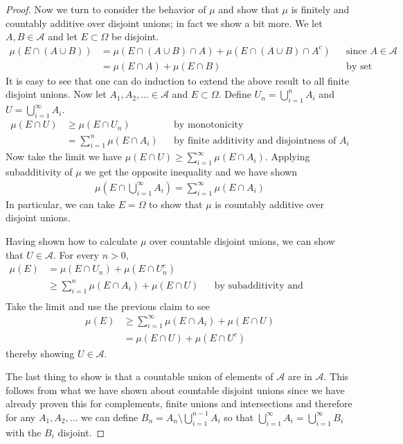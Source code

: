 \begin{proof}
Now we turn to consider the behavior of $\mu$ and show that $\mu$ is
finitely and countably additive over disjoint unions; in fact we show
a bit more.
We let $A,B \in \mathcal{A}$ and let $E \subset \Omega$
be disjoint.
\begin{align*}
\mu(E \cap (A \cup B)) &= \mu(E \cap (A \cup B) \cap A) + \mu(E \cap
(A \cup B) \cap A^c) & & \text{since $A \in \mathcal{A}$} \\
&= \mu(E \cap A) + \mu(E \cap B) & &\text{by set algebra}
\end{align*}
It is easy to see that one can do induction to extend the above result
to all finite disjoint unions.
Now let $A_1, A_2, \dots \in \mathcal{A}$ and $E \subset \Omega$.
Define $U_n = \bigcup_{i=1}^n A_i$ and $U = \bigcup_{i=1}^\infty A_i$.
\begin{align*}
\mu(E \cap U) &\geq \mu(E \cap U_n) & & \text{by monotonicity} \\
&= \sum_{i=1}^n \mu(E \cap A_i) & &\text{by finite additivity and
  disjointness of $A_i$}
\end{align*}
Now take the limit we have $\mu(E \cap U) \geq \sum_{i=1}^\infty \mu(E
\cap A_i)$.  Applying subadditivity of $\mu$ we get the opposite
inequality and we have shown 
\begin{align*}
\mu(E \cap \bigcup_{i=1}^\infty A_i) = \sum_{i=1}^\infty \mu(E
\cap A_i)
\end{align*}
In particular, we can take $E=\Omega$ to show that $\mu$ is countably
additive over disjoint unions.

Having shown how to calculate $\mu$ over countable disjoint unions, we
can show that $U \in \mathcal{A}$. For every $n > 0$,
\begin{align*}
\mu(E) &= \mu(E \cap U_n) + \mu(E \cap U_n^c) \\
&\geq \sum_{i=1}^n \mu(E \cap A_i) + \mu(E \cap U) & & \text{by
  subadditivity and monotonicity} \\
\end{align*}
Take the limit and use the previous claim to see
\begin{align*}
\mu(E) &\geq \sum_{i=1}^\infty \mu(E \cap A_i) + \mu(E \cap U) \\
&= \mu(E \cap U) + \mu(E \cap U^c)
 \end{align*}
thereby showing $U \in \mathcal{A}$.

The last thing to show is that a countable union of elements of
$\mathcal{A}$ are in $\mathcal{A}$.  This follows from what we have
shown about countable
disjoint unions since we have already proven this for complements, finite unions
and intersections and therefore for any $A_1,A_2, \dots$ we can define
$B_n = A_n \setminus \bigcup_{i=1}^{n-1} A_i$ so that
$\bigcup_{i=1}^\infty A_i =\bigcup_{i=1}^\infty B_i$ with the $B_i$ disjoint.
\end{proof}


